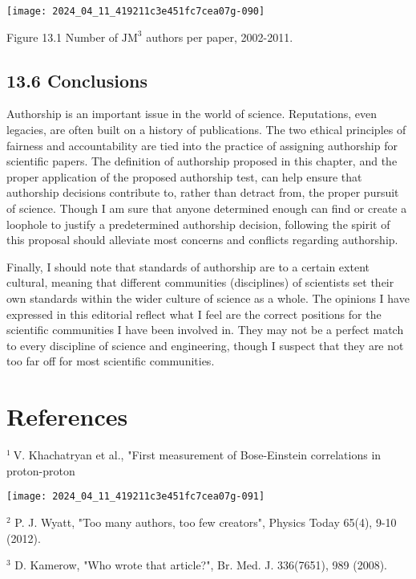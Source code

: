 \begin{center}
\texttt{[image: 2024\_04\_11\_419211c3e451fc7cea07g-090]}
\end{center}

Figure 13.1 Number of $\mathrm{JM}^{3}$ authors per paper, 2002-2011.

\subsection*{13.6 Conclusions}
Authorship is an important issue in the world of science. Reputations, even legacies, are often built on a history of publications. The two ethical principles of fairness and accountability are tied into the practice of assigning authorship for scientific papers. The definition of authorship proposed in this chapter, and the proper application of the proposed authorship test, can help ensure that authorship decisions contribute to, rather than detract from, the proper pursuit of science. Though I am sure that anyone determined enough can find or create a loophole to justify a predetermined authorship decision, following the spirit of this proposal should alleviate most concerns and conflicts regarding authorship.

Finally, I should note that standards of authorship are to a certain extent cultural, meaning that different communities (disciplines) of scientists set their own standards within the wider culture of science as a whole. The opinions I have expressed in this editorial reflect what I feel are the correct positions for the scientific communities I have been involved in. They may not be a perfect match to every discipline of science and engineering, though I suspect that they are not too far off for most scientific communities.

\section*{References}
${ }^{1} \mathrm{~V}$. Khachatryan et al., "First measurement of Bose-Einstein correlations in proton-proton

\begin{center}
\texttt{[image: 2024\_04\_11\_419211c3e451fc7cea07g-091]}
\end{center}

${ }^{2}$ P. J. Wyatt, "Too many authors, too few creators", Physics Today 65(4), 9-10 (2012).

${ }^{3}$ D. Kamerow, "Who wrote that article?", Br. Med. J. 336(7651), 989 (2008).

